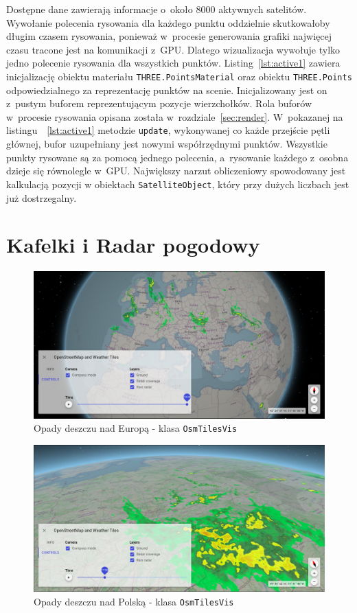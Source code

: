 Dostępne dane zawierają informacje o~około 8000 aktywnych satelitów. Wywołanie polecenia rysowania dla każdego punktu oddzielnie skutkowałoby długim czasem rysowania, ponieważ w~procesie generowania grafiki najwięcej czasu tracone jest na komunikacji z~GPU. Dlatego wizualizacja wywołuje tylko jedno polecenie rysowania dla wszystkich punktów. Listing~\ref{lst:active1} zawiera inicjalizację obiektu materiału \texttt{THREE.PointsMaterial} oraz obiektu \texttt{THREE.Points} odpowiedzialnego za reprezentację punktów na scenie. Inicjalizowany jest on z~pustym buforem reprezentującym pozycje wierzchołków. Rola buforów w~procesie rysowania opisana została w~rozdziale~\ref{sec:render}. W~pokazanej na listingu~~\ref{lst:active1} metodzie \texttt{update}, wykonywanej co każde przejście pętli głównej, bufor uzupełniany jest nowymi współrzędnymi punktów. Wszystkie punkty rysowane są za pomocą jednego polecenia, a~rysowanie każdego z~osobna dzieje się równolegle w~GPU. Największy narzut obliczeniowy spowodowany jest kalkulacją pozycji w obiektach \texttt{SatelliteObject}, który przy dużych liczbach jest już dostrzegalny.

\section{Kafelki i Radar pogodowy}


\begin{figure}
  \centering
  \includegraphics[width=\linewidth]{img/c4_osmTilesVis.png}
  \caption{Opady deszczu nad Europą - klasa \texttt{OsmTilesVis}}
  \label{fig:c4_osmTilesVis} 
\end{figure}

\begin{figure}
  \centering
  \includegraphics[width=\linewidth]{img/c4_osmTilesVis_1.png}
  \caption{Opady deszczu nad Polską - klasa \texttt{OsmTilesVis}}
  \label{fig:c4_osmTilesVis_1} 
\end{figure}


